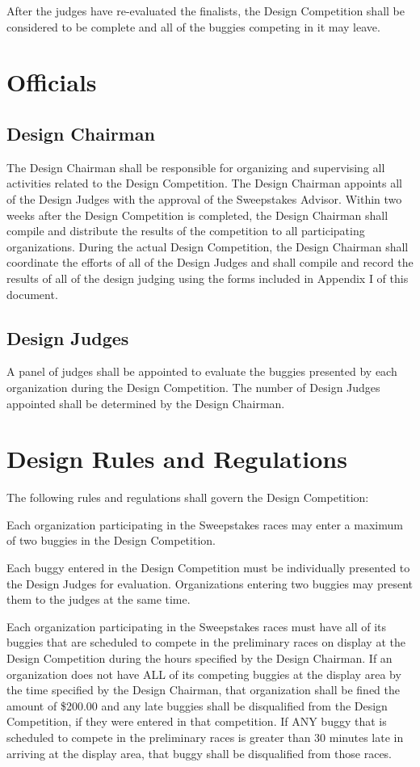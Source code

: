 	After the judges have re-evaluated the finalists, the Design Competition shall
	be considered to be complete and all of the buggies competing in it may leave.

\section{Officials}

\subsection{Design Chairman}

	The Design Chairman shall be responsible for organizing and supervising all
	activities related to the Design Competition. The Design Chairman appoints all
	of the Design Judges with the approval of the Sweepstakes Advisor. Within two
	weeks after the Design Competition is completed, the Design Chairman shall
	compile and distribute the results of the competition to all participating
	organizations. During the actual Design Competition, the Design Chairman shall
	coordinate the efforts of all of the Design Judges and shall compile and record
	the results of all of the design judging using the forms included in Appendix I
	of this document.

\subsection{Design Judges}

	A panel of judges shall be appointed to evaluate the buggies presented by each
	organization during the Design Competition. The number of Design Judges
	appointed shall be determined by the Design Chairman.

\section{Design Rules and Regulations}
	
	The following rules and regulations shall govern the Design Competition:

	Each organization participating in the Sweepstakes races may enter a maximum of
	two buggies in the Design Competition.

	Each buggy entered in the Design Competition must be individually presented to
	the Design Judges for evaluation. Organizations entering two buggies may
	present them to the judges at the same time.

	Each organization participating in the Sweepstakes races must have all of its
	buggies that are scheduled to compete in the preliminary races on display at
	the Design Competition during the hours specified by the Design Chairman. If an
	organization does not have ALL of its competing buggies at the display area by
	the time specified by the Design Chairman, that organization shall be fined the
	amount of \$200.00 and any late buggies shall be disqualified from the Design
	Competition, if they were entered in that competition. If ANY buggy that is
	scheduled to compete in the preliminary races is greater than 30 minutes late
	in arriving at the display area, that buggy shall be disqualified from those
	races.

